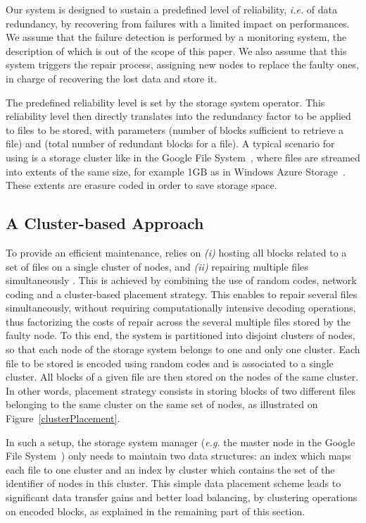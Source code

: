 
Our \crc system is designed to sustain a predefined level
of reliability, \textit{i.e.} of data redundancy, by recovering from
failures with a limited impact on performances. We assume that the
failure detection is performed by a monitoring system, the description of which is out of the scope of this paper. We also assume that this system 
triggers the repair process, assigning new nodes to replace the faulty ones,
in charge of recovering the lost data and store it.

The predefined reliability level  is set by the storage system 
operator. This reliability level then directly translates into the
redundancy factor to be applied to files to be stored, with parameters
 (number of blocks sufficient to retrieve a file) and  (total
number of redundant blocks for a file). A typical scenario for using
\crc is a storage cluster like in the Google File
System~\cite{gfs}, where files are streamed into extents of the same
size, for example 1GB as in Windows Azure Storage~\cite{azure}.
These extents are erasure coded in order to save storage space.

\subsection{A Cluster-based Approach}

To provide an efficient maintenance, \crc relies on \textit{(i)} hosting  all blocks related to a set of files on a single cluster of nodes, and \textit{(ii)} repairing multiple files simultaneously .  This is achieved by combining the use of random codes, network coding and a cluster-based placement strategy. This enables to repair several files simultaneously, without requiring computationally intensive decoding operations, thus factorizing the costs of repair across the several multiple files stored by the faulty node. To this end, the system is  partitioned into disjoint clusters of  nodes,
 so that each node of the storage system belongs to one and only one cluster. 
Each file to be stored is encoded using random codes and is associated to a single cluster. All blocks of a given file are then stored on the  nodes of the same cluster. In other words, \crc placement strategy consists in storing blocks of two different files belonging to the same cluster on the same set of nodes, as illustrated on Figure~\ref{clusterPlacement}.

In such a setup, the storage system manager (\textit{e.g.} the master
node in the Google File System~\cite{gfs}) only needs to maintain two
data structures: an index which maps each file to one cluster and an
index by cluster which contains the set of the identifier of nodes in
this cluster. This simple data placement scheme leads to 
 significant data transfer gains and better load balancing, by clustering operations
on encoded blocks, as explained in the remaining part of this section.

